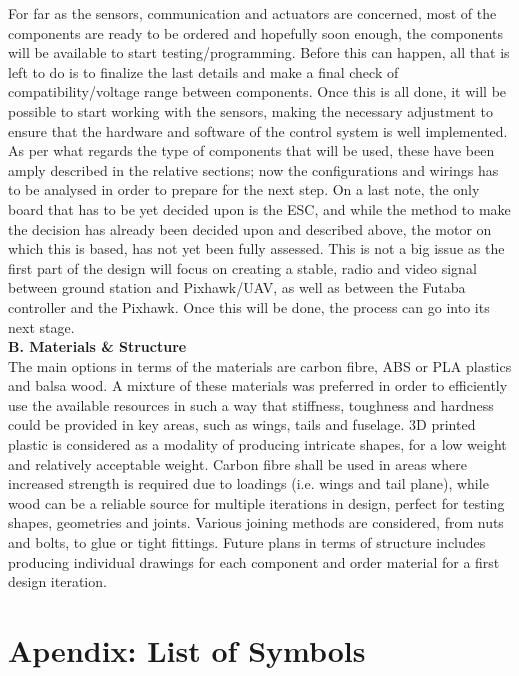 \documentclass[12pt]{article}
\begin{document}
\noindent For far as the sensors, communication and actuators are concerned, most of the components are ready to be ordered and hopefully soon enough, the components will be available to start testing/programming. Before this can happen, all that is left to do is to finalize the last details and make a final check of compatibility/voltage range between components. Once this is all done, it will be possible to start working with the sensors, making the necessary adjustment to ensure that the hardware and software of the control system is well implemented. As per what regards the type of components that will be used, these have been amply described in the relative sections; now the configurations and wirings has to be analysed in order to prepare for the next step. On a last note, the only board that has to be yet decided upon is the ESC, and while the method to make the decision has already been decided upon and described above, the motor on which this is based, has not yet been fully assessed. This is not a big issue as the first part of the design will focus on creating a stable, radio and video signal between ground station and Pixhawk/UAV, as well as between the Futaba controller and the Pixhawk. Once this will be done, the process can go into its next stage. \\

\noindent \textbf{B. Materials \& Structure}\\
\noindent The main options in terms of the materials are carbon fibre, ABS or PLA plastics and balsa wood. A mixture of these materials was preferred in order to efficiently use the available resources in such a way that stiffness, toughness and hardness could be provided in key areas, such as wings, tails and fuselage. 3D printed plastic is considered as a modality of producing intricate shapes, for a low weight and relatively acceptable weight. Carbon fibre shall be used in areas where increased strength is required due to loadings (i.e. wings and tail plane), while wood can be a reliable source for multiple iterations in design, perfect for testing shapes, geometries and joints. Various joining methods are considered, from nuts and bolts, to glue or tight fittings. Future plans in terms of structure includes producing individual drawings for each component and order material for a first design iteration. 

\newpage

\appendix

\section{Apendix: List of Symbols}
\end{document}
